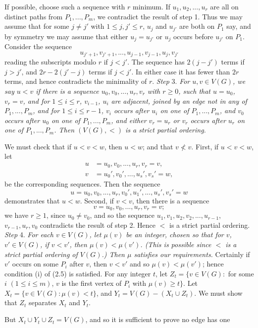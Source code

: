 If possible, choose such a sequence with $r$ minimum. If $u_1, u_2,..., u_r$ are all
on distinct paths from $P_1,..., P_m$, we contradict the result of step 1. Thus we
may assume that for some $j\ne j'$ with $1\le j, j'\le r$, $u_j$ and $u_{j'}$ are both on $P_1$
say, and by symmetry we may assume that either $u_j=u_{j'}$ or $u_j$ occurs before
$u_{j'}$ on $P_1$. Consider the sequence
\begin{equation*}
u_{j'+1}, v_{j'+1},..., u_{j-1}, v_{j-1}, u_j, v_{j'}
\end{equation*}
reading the subscripts modulo $r$ if $j<j'$. The sequence has $2(j-j')$ terms if
$j>j'$, and $2r-2(j'-j)$ terms if $j<j'$. In either case it has fewer than $2r$
terms, and hence contradicts the minimality of $r$.
\stmt
\textit{Step} 3. \textit{For $u, v\in V(G)$, we say $u<v$ if there is a sequence
$u_0, v_0,..., u_r, v_r$ with $r\ge 0$, such that $u=u_0$, $v_r=v$, and for $1\le i\le r$, $v_{i-1}$,
$u_i$ are adjacent, joined by an edge not in any of $P_1,..., P_m$, and for
$1\le i\le r-1$, $v_i$ occurs after $u_i$ on one of $P_1,..., P_m$, and $v_0$ occurs after $u_0$ on
one of $P_1,..., P_m$, and either $v_r=u_r$ or $v_r$ occurs after $u_r$ on one of $P_1,..., P_m$.
Then $(V(G), <)$ is a strict partial ordering.}

We must check that if $u<v<w$, then $u<w$; and that $v\nless v$. First, if
$u<v<w$, let
\begin{align*}
u&=u_0, v_0,..., u_r, v_r=v,\\
v&=u_0', v_0',..., u_s', v_s'=w,
\end{align*}
be the corresponding sequences. Then the sequence
\begin{equation*}
u=u_0, v_0,..., u_r, v_0', u_1',..., u_s', v_s'=w
\end{equation*}
demonstrates that $u<w$. Second, if $v<v$, then there is a sequence
\begin{equation*}
v=u_0, v_0,..., u_r, v_r=v;
\end{equation*}
we have $r\ge 1$, since $u_0\ne v_0$, and so the sequence $u_1, v_1, u_2, v_2,..., u_{r-1}$,
$v_{r-1}, u_r, v_0$ contradicts the result of step 2. Hence $<$ is a strict partial
ordering.
\stmt
\textit{Step} 4. \textit{For each $v\in V(G)$, let $\mu(v)$ be an integer, chosen so that for $v$,
$v'\in V(G)$, if $v<v'$, then $\mu(v)<\mu(v')$. (This is possible since $<$ is a strict
partial ordering of $V(G)$.) Then $\mu$ satisfies our requirements.}
\stmt
Certainly if $v'$ occurs on some $P_i$ after $v$, then $v<v'$ and so $\mu(v)<\mu(v')$;
hence condition (i) of (2.5) is satisfied. For any integer $t$, let $Z_t=\{v\in V(G)\colon$
for some $i$ $(1\le i\le m)$, $v$ is the first vertex of $P_i$ with $\mu(v)\ge t\}$. Let $X_t=
\{v\in V(G)\colon\mu(v)<t\}$, and $Y_t=V(G)-(X_t\cup Z_t)$. We must show that $Z_t$
separates $X_t$ and $Y_t$.

But $X_t\cup Y_t\cup Z_t=V(G)$, and so it is sufficient to prove no edge has one
